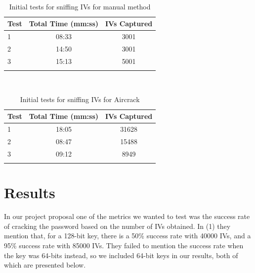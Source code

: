 \documentclass[10pt, titlepage]{article}
\begin{document}
\begin{table}[H]
	\centering
	\caption{Initial tests for sniffing IVs for manual method}~\\
	\begin{tabular}{lcc}
		Test	& Total Time (mm:ss)	& IVs Captured \\
		\hline
		1		& 	08:33						& 3001 \\
		2		& 	14:50						& 3001 \\
		3		& 	15:13						& 5001 \\		
		\hline \\
	\end{tabular}
\end{table}

\begin{table}[H]
	\centering
	\caption{Initial tests for sniffing IVs for Aircrack}~\\
	\begin{tabular}{lcc}
		Test	& Total Time (mm:ss)	& IVs Captured \\
		\hline
		1		& 	18:05						& 31628 \\
		2		& 	08:47						& 15488 \\
		3		& 	09:12						& 8949 \\		
		\hline \\
	\end{tabular}
\end{table}



\section{Results}
In our project proposal one of the metrics we wanted to test was the success rate of cracking the password based on the number of IVs obtained. In (1) they mention that, for a 128-bit key, there is a 50\% success rate with 40000 IVs, and a 95\% success rate with 85000 IVs. They failed to mention the success rate when the key was 64-bits instead, so we included 64-bit keys in our results, both of which are presented below.\\
\end{document}
